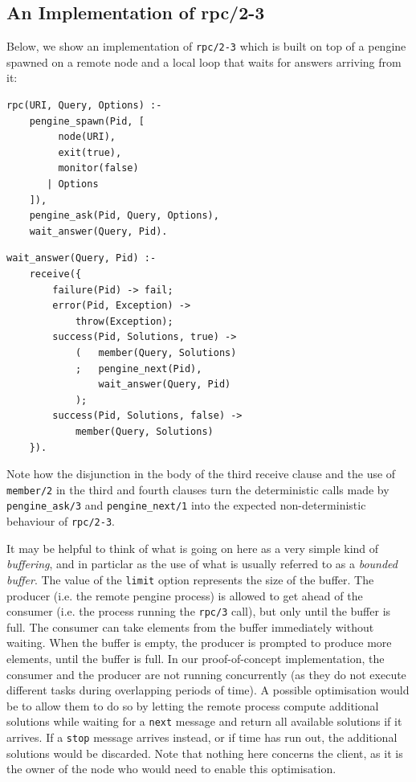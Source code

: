 \documentclass{tlp}
\begin{document}
\subsection{An Implementation of rpc/2-3}\label{sec:rpc-implementation}

\noindent Below, we show an implementation of \texttt{rpc/2-3} which is built on top of a pengine spawned on a remote node and a local loop that waits for answers arriving from it:


\begin{lstlisting}
rpc(URI, Query, Options) :-
    pengine_spawn(Pid, [
         node(URI),
         exit(true),
         monitor(false)
       | Options
    ]),
    pengine_ask(Pid, Query, Options),
    wait_answer(Query, Pid).
\end{lstlisting}

\begin{lstlisting}
wait_answer(Query, Pid) :-
    receive({
        failure(Pid) -> fail;            
        error(Pid, Exception) -> 
            throw(Exception);                  
        success(Pid, Solutions, true) -> 
            (   member(Query, Solutions)
            ;   pengine_next(Pid), 
                wait_answer(Query, Pid)
            );
        success(Pid, Solutions, false) -> 
            member(Query, Solutions)
    }).
\end{lstlisting}

\noindent Note how the disjunction in the body of the third receive clause and the use of \texttt{member/2} in the third and fourth clauses turn the deterministic calls made by \texttt{pengine\_ask/3} and \texttt{pengine\_next/1} into the expected non-deterministic behaviour of \texttt{rpc/2-3}. 

It may be helpful to think of what is going on here as a very simple kind of \textit{buffering}, and in particlar as the use of what is usually referred to as a \textit{bounded buffer}. The value of the \texttt{limit} option represents the size of the buffer. The producer (i.e. the remote pengine process) is allowed to get ahead of the consumer (i.e. the process running the \texttt{rpc/3} call), but only until the buffer is full. The consumer can take elements from the buffer immediately without waiting. When the buffer is empty, the producer is prompted to produce more elements, until the buffer is full. In our proof-of-concept implementation, the consumer and the producer are not running concurrently (as they do not execute different tasks during overlapping periods of time). A possible optimisation would be to allow them to do so by letting the remote process compute additional solutions while waiting for a \texttt{next} message and return all available solutions if it arrives. If a \texttt{stop} message arrives instead, or if time has run out, the additional solutions would be discarded. Note that nothing here concerns the client, as it is the owner of the node who would need to enable this optimisation.
\end{document}
